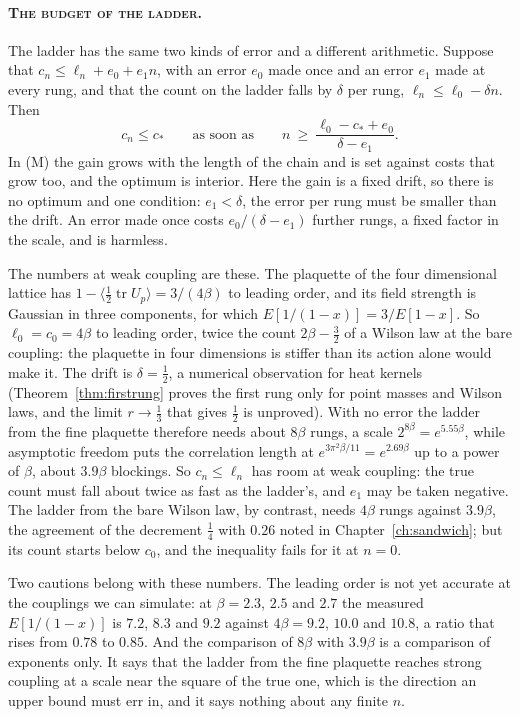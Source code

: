 \paragraph{\normalfont\scshape The budget of the ladder.} The ladder has the same two kinds of error and a different arithmetic. Suppose that $c_n\le\ell_n+e_0+e_1n$, with an error $e_0$ made once and an error $e_1$ made at every rung, and that the count on the ladder falls by $\delta$ per rung, $\ell_n\le\ell_0-\delta n$. Then
\[
c_n\le c_*\qquad\text{as soon as}\qquad n\ \ge\ \frac{\ell_0-c_*+e_0}{\delta-e_1}.
\]
In (M) the gain grows with the length of the chain and is set against costs that grow too, and the optimum is interior. Here the gain is a fixed drift, so there is no optimum and one condition: $e_1<\delta$, the error per rung must be smaller than the drift. An error made once costs $e_0/(\delta-e_1)$ further rungs, a fixed factor in the scale, and is harmless.

The numbers at weak coupling are these. The plaquette of the four dimensional lattice has $1-\langle\frac12\operatorname{tr}U_p\rangle=3/(4\beta)$ to leading order, and its field strength is Gaussian in three components, for which $E[1/(1-x)]=3/E[1-x]$. So $\ell_0=c_0=4\beta$ to leading order, twice the count $2\beta-\frac32$ of a Wilson law at the bare coupling: the plaquette in four dimensions is stiffer than its action alone would make it. The drift is $\delta=\frac12$, a numerical observation for heat kernels (Theorem~\ref{thm:firstrung} proves the first rung only for point masses and Wilson laws, and the limit $r\to\frac13$ that gives $\frac12$ is unproved). With no error the ladder from the fine plaquette therefore needs about $8\beta$ rungs, a scale $2^{8\beta}=e^{5.55\beta}$, while asymptotic freedom puts the correlation length at $e^{3\pi^2\beta/11}=e^{2.69\beta}$ up to a power of $\beta$, about $3.9\beta$ blockings. So $c_n\le\ell_n$ has room at weak coupling: the true count must fall about twice as fast as the ladder's, and $e_1$ may be taken negative. The ladder from the bare Wilson law, by contrast, needs $4\beta$ rungs against $3.9\beta$, the agreement of the decrement $\frac14$ with $0.26$ noted in Chapter~\ref{ch:sandwich}; but its count starts below $c_0$, and the inequality fails for it at $n=0$.

Two cautions belong with these numbers. The leading order is not yet accurate at the couplings we can simulate: at $\beta=2.3$, $2.5$ and $2.7$ the measured $E[1/(1-x)]$ is $7.2$, $8.3$ and $9.2$ against $4\beta=9.2$, $10.0$ and $10.8$, a ratio that rises from $0.78$ to $0.85$. And the comparison of $8\beta$ with $3.9\beta$ is a comparison of exponents only. It says that the ladder from the fine plaquette reaches strong coupling at a scale near the square of the true one, which is the direction an upper bound must err in, and it says nothing about any finite $n$.

